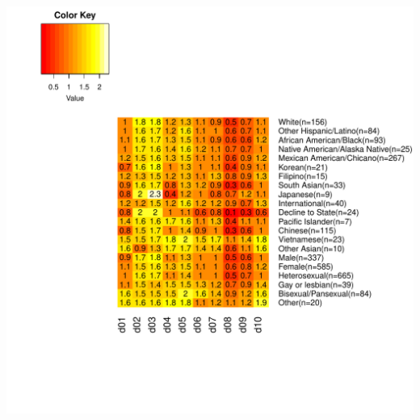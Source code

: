 \documentclass{article}\usepackage[]{graphicx}\usepackage[]{color}
\makeatletter
\def\maxwidth{ %
  \ifdim\Gin@nat@width>\linewidth
    \linewidth
  \else
    \Gin@nat@width
  \fi
}
\makeatother
\begin{document}
\includegraphics[width=\maxwidth]{figure/unnamed-chunk-18-5} \hfill{}
\end{document}
